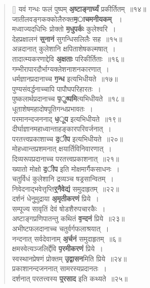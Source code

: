 \documentclass[twoside,12pt,notitlepage]{book}
\begin{document}
\begin{verse}[\versewidth]
यवं गन्धः फलं पुष्पम् \textbf{\b अष्टाङ्गार्घ्यं} प्रकीर्तितम्~॥१४॥\\
जातीलवङ्गकक्कोलैरुक्त\textbf{\b माचमनीयकम्} ~।\\ [-6pt]
मध्वाज्यदधिभिः प्रोक्तो \textbf{\b मधुपर्कः} कुलेश्वरि~।\\[-6pt]
देहप्रक्षालनं \textbf{\b स्नानं} सुगन्धिसलिलैः सह~॥१५॥\\
अन्नदानात् कुलेशानि क्षपिताशेषकल्मषात्~।\\[-6pt]
तादात्म्यकरणाद्देवि \textbf{\b अक्षताः} परिकीर्तिताः~॥१६॥\\
गम्भीरापारदौर्भाग्यक्लेशनाशनकारणात्~।\\[-6pt]
धर्मज्ञानप्रदानाच्च \textbf{\b गन्ध} इत्यभिधीयते~॥१७॥\\
पुण्यसंवर्द्धनाच्चापि पापौघपरिहारतः~।\\[-6pt]
पुष्कलार्थप्रदानाच्च \textbf{\b पुष्पमि}त्यभिधीयते~॥१८॥\\
धूताशेषमहादोषपूतिगन्धप्रभावतः~।\\[-6pt]
परमानन्दजननाद् \textbf{\b धूप} इत्यभिधीयते~॥१९॥\\
दीर्घाज्ञानमहाध्वान्ताहङ्कारपरिवर्जनात्~।\\[-6pt]
परतत्त्वप्रकाशाच्च \textbf{\b दीप} इत्यभिधीयते~॥२०॥\\
मोहध्वान्तप्रशमनात् क्षयार्तिविनिवारणात्~।\\[-6pt]
दिव्यरूपप्रदानाच्च परतत्त्वप्रकाशनात्~॥२१॥\\
ख्यातो  मोक्षो \textbf{\b दीप} इति मोक्षमार्गैकसाधनः~।\\[-6pt]
चतुर्विधं कुलेशानि द्रव्यञ्च षड्रसान्वितम्~।\\[-6pt]
निवेदनाद्भवेत्तृप्ति\textbf{\b र्नैवेद्यं} समुदाहृतम्~॥२२॥\\
दर्शनं धेनुुमुद्राया \textbf{\b अमृतीकरणं} प्रिये~।\\[-6pt]
सम्पूज्य सावृतिं देवं षोडशैरुपचारकैः~।\\[-6pt]
अष्टाङ्गप्रणिपातन्तु कथितं \textbf{\b वन्दनं} प्रिये~॥२३॥\\
अभीष्टफलदानाच्च चतुर्वर्गफलाश्रयात्~।\\[-6pt]
नन्दनात् सर्वदेवानाम् \textbf{\b अर्चनं} समुदाहृतम्~॥६॥\\
क्षमस्वेत्यञ्जलिर्द्देवि \textbf{\b परमीकरणं} प्रिये~।\\[-6pt]
स्वस्थानप्रेषणं प्रोक्तम् \textbf{\b उद्वासन}मिति प्रिये~॥२४॥\\
प्रकाशानन्दजननात् सामरस्यप्रदानतः~।\\[-6pt]
दर्शनात् परतत्त्वस्य \textbf{\b प्रसाद} इति कथ्यते~॥२५॥\\

\end{verse}
\end{document}
